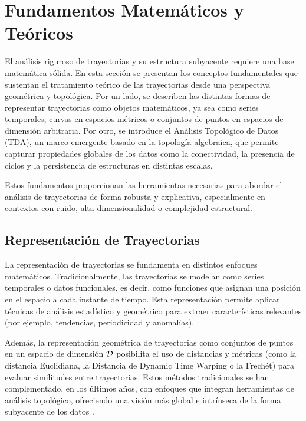 
\section{Fundamentos Matemáticos y Teóricos}

El análisis riguroso de trayectorias y su estructura subyacente requiere una base matemática sólida. En esta sección se presentan los conceptos fundamentales que sustentan el tratamiento teórico de las trayectorias desde una perspectiva geométrica y topológica. Por un lado, se describen las distintas formas de representar trayectorias como objetos matemáticos, ya sea como series temporales, curvas en espacios métricos o conjuntos de puntos en espacios de dimensión arbitraria. Por otro, se introduce el Análisis Topológico de Datos (TDA), un marco emergente basado en la topología algebraica, que permite capturar propiedades globales de los datos como la conectividad, la presencia de ciclos y la persistencia de estructuras en distintas escalas.

Estos fundamentos proporcionan las herramientas necesarias para abordar el análisis de trayectorias de forma robusta y explicativa, especialmente en contextos con ruido, alta dimensionalidad o complejidad estructural.

\vspace{2cm}
\subsection{Representación de Trayectorias}

La representación de trayectorias se fundamenta en distintos enfoques matemáticos. Tradicionalmente, las trayectorias se modelan como series temporales o datos funcionales, es decir, como funciones que asignan una posición en el espacio a cada instante de tiempo. Esta representación permite aplicar técnicas de análisis estadístico y geométrico para extraer características relevantes (por ejemplo, tendencias, periodicidad y anomalías).

\vspace{0.1cm}

Además, la representación geométrica de trayectorias como conjuntos de puntos en un espacio de dimensión \({\cal D}\) posibilita el uso de distancias y métricas (como la distancia Euclidiana, la Distancia de Dynamic Time Warping o la Frechét) para evaluar similitudes entre trayectorias. Estos métodos tradicionales se han complementado, en los últimos años, con enfoques que integran herramientas de análisis topológico, ofreciendo una visión más global e intrínseca de la forma subyacente de los datos \cite{leykam2023topological}.

